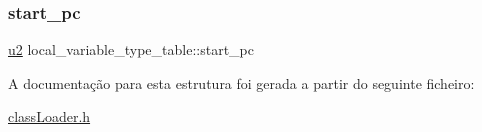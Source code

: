 \mbox{\label{structlocal__variable__type__table_ac103af911d6332aa10c82d84c8afa57c}} 
\subsubsection{\texorpdfstring{start\+\_\+pc}{start\_pc}}
{\footnotesize\ttfamily \hyperlink{util_8h_a55ef8d87fd202b8417704c089899c5b9}{u2} local\+\_\+variable\+\_\+type\+\_\+table\+::start\+\_\+pc}



A documentação para esta estrutura foi gerada a partir do seguinte ficheiro\+:\begin{DoxyCompactItemize}
\item 
\hyperlink{class_loader_8h}{class\+Loader.\+h}\end{DoxyCompactItemize}
